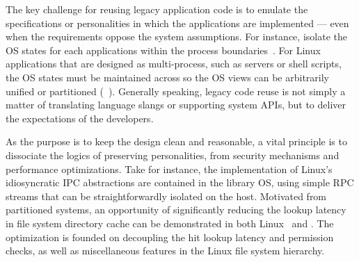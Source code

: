 
The key challenge for reusing legacy application code
is to emulate the specifications or personalities in which the applications are implemented
--- even when the requirements oppose the system assumptions.
For instance,
\picoprocs{} isolate the OS states for each applications
within the process boundaries~\citep{porter11drawbridge, baumann13bascule, baumann14haven}.
For Linux applications that are designed as multi-process,
such as servers or shell scripts,
the OS states must be maintained across \picoprocs{}
so the OS views can be arbitrarily unified or partitioned
(\term{\graphene{}}~\citep{tsai14graphene}).
Generally speaking,
legacy code reuse is not simply a matter of translating language slangs or supporting system APIs,
but to deliver the expectations of the developers.

As the purpose is to keep the design
clean and reasonable,
a vital principle is to dissociate the logics of preserving personalities,
from security mechanisms and performance optimizations.
Take \graphene{} for instance,
the implementation of Linux's idiosyncratic IPC abstractions
are contained in the library OS,
using simple RPC streams
that can be straightforwardly isolated on the host.
Motivated from partitioned systems,
an opportunity of significantly reducing the lookup latency
in file system directory cache
can be demonstrated in both Linux~\citep{tsai15dcache} and \graphene{}.
The optimization is founded on
decoupling the hit lookup latency and permission checks,
as well as miscellaneous features in the Linux file system hierarchy.

